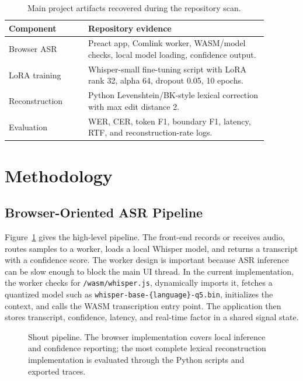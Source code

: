 \documentclass[11pt]{article}
\begin{document}
\begin{table}[t]
\centering
\small
\begin{tabular}{p{0.27\linewidth}p{0.61\linewidth}}
\toprule
Component & Repository evidence\\
\midrule
Browser ASR & Preact app, Comlink worker, WASM/model checks, local model loading, confidence output.\\
LoRA training & Whisper-small fine-tuning script with LoRA rank 32, alpha 64, dropout 0.05, 10 epochs.\\
Reconstruction & Python Levenshtein/BK-style lexical correction with max edit distance 2.\\
Evaluation & WER, CER, token F1, boundary F1, latency, RTF, and reconstruction-rate logs.\\
\bottomrule
\end{tabular}
\caption{Main project artifacts recovered during the repository scan.}
\label{tab:artifacts}
\end{table}

\section{Methodology}

\subsection{Browser-Oriented ASR Pipeline}

Figure~\ref{fig:pipeline} gives the high-level pipeline. The front-end records or receives audio, routes samples to a worker, loads a local Whisper model, and returns a transcript with a confidence score. The worker design is important because ASR inference can be slow enough to block the main UI thread. In the current implementation, the worker checks for \texttt{/wasm/whisper.js}, dynamically imports it, fetches a quantized model such as \texttt{whisper-base-\{language\}-q5.bin}, initializes the context, and calls the WASM transcription entry point. The application then stores transcript, confidence, latency, and real-time factor in a shared signal state.

\begin{figure}[t]
\centering
{}
\caption{Shout pipeline. The browser implementation covers local inference and confidence reporting; the most complete lexical reconstruction implementation is evaluated through the Python scripts and exported traces.}
\label{fig:pipeline}
\end{figure}
\end{document}
